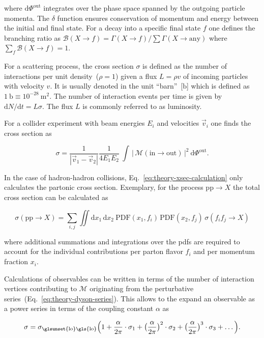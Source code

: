 where $\mathrm{d}\Phi^\mathrm{out}$ integrates over the phase space spanned by the outgoing particle momenta. The $\delta$ function ensures conservation of momentum and energy between the initial and final state. For a decay into a specific final state $f$ one defines the branching ratio as $\mathcal{B}(X\to f)=\Gamma(X \to f)/\sum\Gamma(X \to\mathrm{any})$ where $\sum_{f}\mathcal{B}(X \to f)=1$.

For a scattering process, the cross section $\sigma$ is defined as the number of interactions per unit density~($\rho=1$) given a flux $L=\rho v$ of incoming particles with velocity $v$. It is usually denoted in the unit ``barn''~[$\mathrm{b}$] which is defined as $1~\mathrm{b}\equiv 10^{-28}~\mathrm{m}^{2}$.  The number of interaction events per time is given by $\mathrm{d}N/\mathrm{d}t=L\sigma$. The flux $L$ is commonly referred to as luminosity.

For a collider experiment with beam energies $E_{i}$ and velocities $\vec{v}_{i}$ one finds the cross section as 

\begin{equation}
\sigma=\frac{1}{|\vec{v}_1-\vec{v}_2|}\frac{1}{4E_{1}E_{2}}~\int\,\big|\,\mathcal{M}(\mathrm{in}\to\mathrm{out})\,\big|^{2}~\mathrm{d}\Phi^\mathrm{out}. \label{eq:theory-xsec-calculation}
\end{equation}

In the case of hadron-hadron collisions, Eq.~\ref{eq:theory-xsec-calculation} only calculates the partonic cross section. Exemplary, for the process $\mathrm{pp}\to X$ the total cross section can be calculated as

\begin{equation}
\sigma(\mathrm{pp}\to X)=\sum_{i,j}\iint\mathrm{d}x_{1}\,\mathrm{d}x_{2}~\mathrm{PDF}(x_{1},f_{i})\,\mathrm{PDF}(x_{2},f_{j})\,\sigma(f_{i}f_{j}\to X)
\end{equation}

where additional summations and integrations over the \glspl{pdf} are required to account for the individual contributions per parton flavor $f_{i}$ and per momentum fraction $x_{i}$.


Calculations of observables can be written in terms of the number of interaction vertices contributing to $\mathcal{M}$ originating from the perturbative series~(Eq.~\ref{eq:theory-dyson-series}). This allows to the expand an observable as a power series in terms of the coupling constant $\alpha$ as

\begin{equation}
\sigma=\sigma_\mathrm{\glsunset{lo}\gls{lo}}\Big(1+\frac{\alpha}{2\pi}\cdot\sigma_\mathrm{1}+\big(\frac{\alpha}{2\pi}\big)^2\cdot\sigma_{2}+\big(\frac{\alpha}{2\pi}\big)^{3}\cdot\sigma_{3}+\ldots\Big).
\end{equation}

